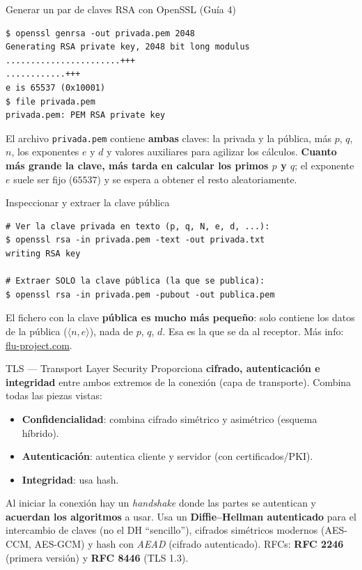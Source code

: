 \documentclass[11pt,a4paper]{article}
\begin{document}
\begin{practbox}{Generar un par de claves RSA con OpenSSL (Guía 4)}
\begin{lstlisting}[style=shell]
$ openssl genrsa -out privada.pem 2048
Generating RSA private key, 2048 bit long modulus
.......................+++
............+++
e is 65537 (0x10001)
$ file privada.pem
privada.pem: PEM RSA private key
\end{lstlisting}
El archivo \texttt{privada.pem} contiene \textbf{ambas} claves: la privada y la pública, más
$p$, $q$, $n$, los exponentes $e$ y $d$ y valores auxiliares para agilizar los cálculos.
\textbf{Cuanto más grande la clave, más tarda en calcular los primos $p$ y $q$}; el exponente
$e$ suele ser fijo ($65537$) y se espera a obtener el resto aleatoriamente.
\end{practbox}

\begin{practbox}{Inspeccionar y extraer la clave pública}
\begin{lstlisting}[style=shell]
# Ver la clave privada en texto (p, q, N, e, d, ...):
$ openssl rsa -in privada.pem -text -out privada.txt
writing RSA key

# Extraer SOLO la clave pública (la que se publica):
$ openssl rsa -in privada.pem -pubout -out publica.pem
\end{lstlisting}
El fichero con la clave \textbf{pública es mucho más pequeño}: solo contiene los datos de la
pública ($\langle n,e\rangle$), nada de $p$, $q$, $d$. Esa es la que se da al receptor.
Más info: \href{https://www.flu-project.com/2019/10/generacion-claves-rsa-Parte-3.html}{flu-project.com}.
\end{practbox}

\begin{defbox}{TLS — Transport Layer Security}
Proporciona \textbf{cifrado, autenticación e integridad} entre ambos extremos de la conexión
(capa de transporte). Combina todas las piezas vistas:
\begin{itemize}[leftmargin=1.4em,itemsep=1pt]
  \item \textbf{Confidencialidad}: combina cifrado simétrico y asimétrico (esquema híbrido).
  \item \textbf{Autenticación}: autentica cliente y servidor (con certificados/PKI).
  \item \textbf{Integridad}: usa hash.
\end{itemize}
Al iniciar la conexión hay un \emph{handshake} donde las partes se autentican y \textbf{acuerdan
los algoritmos} a usar. Usa un \textbf{Diffie--Hellman autenticado} para el intercambio de
claves (no el DH ``sencillo''), cifrados simétricos modernos (AES-CCM, AES-GCM) y hash con
\emph{AEAD} (cifrado autenticado). RFCs: \textbf{RFC 2246} (primera versión) y \textbf{RFC
8446} (TLS 1.3).
\end{defbox}
\end{document}

